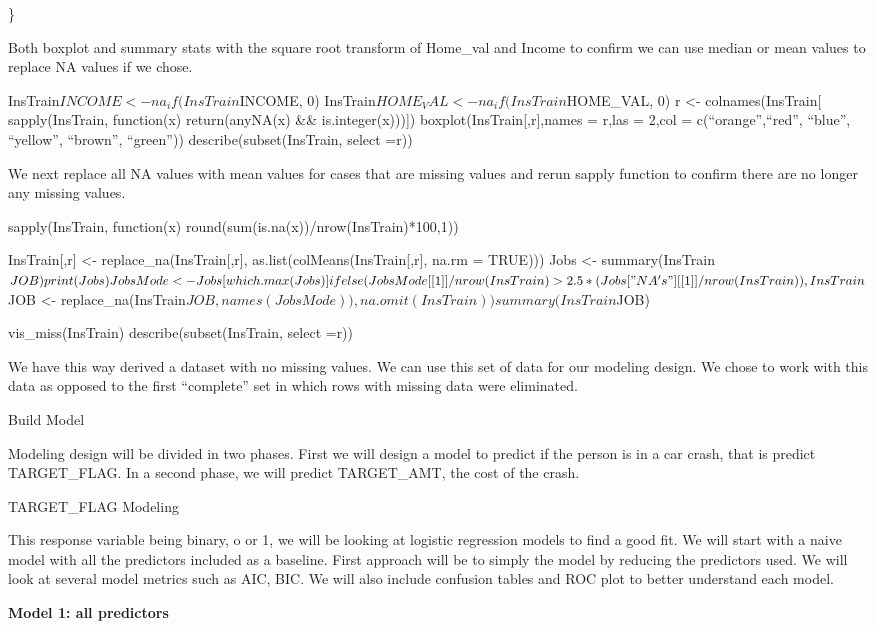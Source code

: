 \documentclass[]{article}
\begin{document}
\}

Both boxplot and summary stats with the square root transform of
Home\_val and Income to confirm we can use median or mean values to
replace NA values if we chose.

InsTrain\(INCOME <- na_if(InsTrain\)INCOME, 0)
InsTrain\(HOME_VAL <- na_if(InsTrain\)HOME\_VAL, 0) r \textless-
colnames(InsTrain{[} sapply(InsTrain, function(x) return(anyNA(x) \&\&
is.integer(x))){]}) boxplot(InsTrain{[},r{]},names = r,las = 2,col =
c(``orange'',``red'', ``blue'', ``yellow'', ``brown'', ``green''))
describe(subset(InsTrain, select =r))

We next replace all NA values with mean values for cases that are
missing values and rerun sapply function to confirm there are no longer
any missing values.

sapply(InsTrain, function(x) round(sum(is.na(x))/nrow(InsTrain)*100,1))

InsTrain{[},r{]} \textless- replace\_na(InsTrain{[},r{]},
as.list(colMeans(InsTrain{[},r{]}, na.rm = TRUE))) Jobs \textless-
summary(InsTrain\(JOB) print(Jobs) JobsMode <- Jobs[which.max(Jobs)] ifelse(JobsMode[[1]] / nrow(InsTrain) > 2.5*(Jobs["NA's"][[1]] / nrow(InsTrain)),  InsTrain\)JOB
\textless-
replace\_na(InsTrain\(JOB, names(JobsMode)),  na.omit(InsTrain)  ) summary(InsTrain\)JOB)

vis\_miss(InsTrain) describe(subset(InsTrain, select =r))

We have this way derived a dataset with no missing values. We can use
this set of data for our modeling design. We chose to work with this
data as opposed to the first ``complete'' set in which rows with missing
data were eliminated.

Build Model

Modeling design will be divided in two phases. First we will design a
model to predict if the person is in a car crash, that is predict
TARGET\_FLAG. In a second phase, we will predict TARGET\_AMT, the cost
of the crash.

TARGET\_FLAG Modeling

This response variable being binary, o or 1, we will be looking at
logistic regression models to find a good fit. We will start with a
naive model with all the predictors included as a baseline. First
approach will be to simply the model by reducing the predictors used. We
will look at several model metrics such as AIC, BIC. We will also
include confusion tables and ROC plot to better understand each model.

\textbf{Model 1: all predictors}
\end{document}
